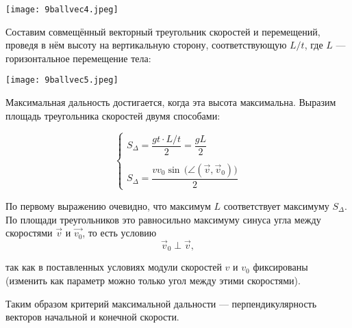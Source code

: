 \documentclass[12pt, a4paper]{article}%
\begin{document}
\begin{center}
\texttt{[image: 9ballvec4.jpeg]}
\label{fig:mpr}
\end{center}

Составим совмещённый векторный треугольник скоростей и перемещений, проведя в нём высоту на вертикальную сторону, соответствующую $L/t$, где $L$ --- горизонтальное перемещение тела:

\begin{center}
\texttt{[image: 9ballvec5.jpeg]}
\label{fig:mpr}
\end{center}

Максимальная дальность достигается, когда эта высота максимальна. Выразим площадь треугольника скоростей двумя способами:


\[
\begin{cases}
S_\Delta = \dfrac{gt \cdot L/t}{2} = \dfrac{gL}{2}\\
\\
S_\Delta = \dfrac{vv_0\sin\! \,\bigl(\angle(\vec v,\vec v_0)\bigr)}{2}
\end{cases}
\]


По первому выражению очевидно, что максимум $L$ соответствует максимуму $S_\Delta$. По площади
треугольников это равносильно максимуму синуса угла между скоростями $\vec{v}$ и $\vec{v_0}$, то есть условию  
\[
\vec v_0 \perp \vec v,
\]

так как в поставленных условиях модули скоростей $v$ и $v_0$ фиксированы (изменить как параметр можно только угол между этими скоростями). 

Таким образом критерий максимальной дальности — перпендикулярность векторов начальной и конечной скорости. 
\end{document}
